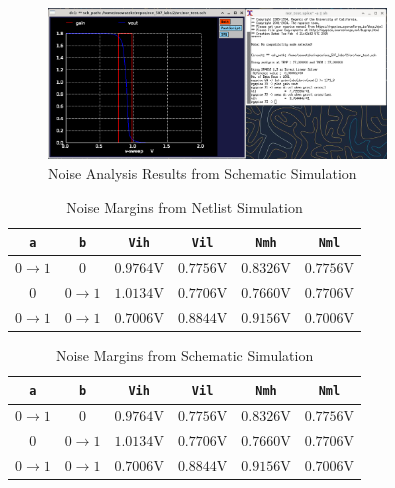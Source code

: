 \documentclass{article}
\begin{document}
	\begin{figure}[H]
		\centerline{\includegraphics[width=0.8\textwidth]{nor_noise_analysis_schem.png}}
		\caption{Noise Analysis Results from Schematic Simulation}
		\label{fig::nor_noise_analysis_schem}
	\end{figure}
	
	\begin{table}[H]
	\begin{center}
	\caption{Noise Margins from Netlist Simulation}
	\label{table::nor_gate_noise_analysis}
	\begin{tabular}{| c | c | c | c | c | c |}
		\hline
		\texttt{a} & \texttt{b} & \texttt{Vih} & \texttt{Vil} & \texttt{Nmh} & \texttt{Nml} \\
		\hline	
		$0 \rightarrow 1$ & $0$ & $0.9764 \text{V}$ & $0.7756 \text{V}$ & $0.8326 \text{V}$ & $0.7756 \text{V}$\\
		\hline	
		$0$ & $0 \rightarrow 1$ & $1.0134 \text{V}$ & $0.7706 \text{V}$ & $0.7660 \text{V}$ & $0.7706 \text{V}$\\
		\hline	
		$0 \rightarrow 1$ & $0 \rightarrow 1$ & $0.7006 \text{V}$ & $0.8844 \text{V}$ & $0.9156 \text{V}$ & $0.7006 \text{V}$\\
		\hline
	\end{tabular}
	\end{center}
	\end{table}
	
	\begin{table}[H]
	\begin{center}
	\caption{Noise Margins from Schematic Simulation}
	\label{table::nor_gate_noise_analysis_schem}
	\begin{tabular}{| c | c | c | c | c | c |}
		\hline
		\texttt{a} & \texttt{b} & \texttt{Vih} & \texttt{Vil} & \texttt{Nmh} & \texttt{Nml} \\
		\hline	
		$0 \rightarrow 1$ & $0$ & $0.9764 \text{V}$ & $0.7756 \text{V}$ & $0.8326 \text{V}$ & $0.7756 \text{V}$\\
		\hline	
		$0$ & $0 \rightarrow 1$ & $1.0134 \text{V}$ & $0.7706 \text{V}$ & $0.7660 \text{V}$ & $0.7706 \text{V}$\\
		\hline	
		$0 \rightarrow 1$ & $0 \rightarrow 1$ & $0.7006 \text{V}$ & $0.8844 \text{V}$ & $0.9156 \text{V}$ & $0.7006 \text{V}$\\
		\hline
	\end{tabular}
	\end{center}
	\end{table}
	
\end{document}

